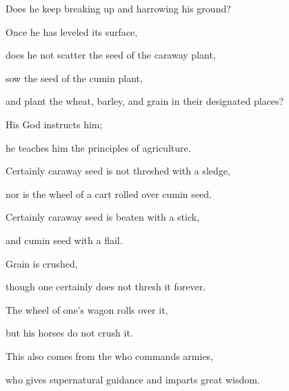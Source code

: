 {\par }{\Q Does he keep breaking up and harrowing
his ground?
\par }{\Q {}Once he has leveled
its surface,
\par }{\Q does
he not scatter
the seed
of the caraway plant,
\par }{\Q sow
the seed of the cumin plant,
\par }{\Q and plant
the wheat,
barley,
and grain
in their designated
places?
\par }{\Q {}His God
instructs
him;
\par }{\Q he teaches
him the principles of agriculture.
\par }{\Q {}Certainly
caraway seed
is not
threshed with
a sledge,
\par }{\Q nor is the wheel
of
a cart
rolled over
cumin seed.
\par }{\Q Certainly
caraway seed
is beaten with
a stick,
\par }{\Q and cumin seed
with a flail.
\par }{\Q {}Grain
is crushed,
\par }{\Q though one certainly
does not
thresh
it forever.
\par }{\Q The wheel
of one’s wagon
rolls over
it,
\par }{\Q but his horses
do not
crush it.
\par }{\Q {}This
also
comes from
the {}
who commands armies,
\par }{\Q who gives
supernatural
guidance
and imparts great
wisdom.

\par }
